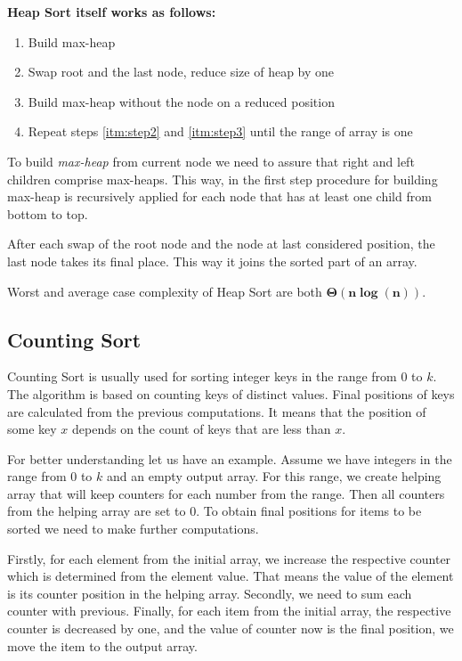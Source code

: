 \documentclass[
  field=inf,
  biblatex,
  language=english,
  glossaries,
  theorems=false,
  sourcecodes=false,
  index
]{kidiplom}
\begin{document}
\textbf{Heap Sort itself works as follows:}
\begin{enumerate}
 \item \label{itm:step1} Build max-heap
 \item \label{itm:step2} Swap root and the last node, reduce size of heap by one
 \item \label{itm:step3} Build max-heap without the node on a reduced position
 \item Repeat steps \ref{itm:step2} and \ref{itm:step3} until the range of array is one
\end{enumerate}

To build \textit{max-heap} from current node we need to assure that right and left children comprise max-heaps. This way, in the first step procedure for building max-heap is recursively applied for each node that has at least one child from bottom to top.

After each swap of the root node and the node at last considered position, the last node takes its final place. This way it joins the sorted part of an array.

Worst and average case complexity of Heap Sort are both $\bm{\Theta(n \log(n))}$.

\subsection{Counting Sort} \label{sec:counting}

Counting Sort is usually used for sorting integer keys in the range from $0$ to $k$. The algorithm is based on counting keys of distinct values. Final positions of keys are calculated from the previous computations. It means that the position of some key $x$ depends on the count of keys that are less than $x$.

For better understanding let us have an example. Assume we have integers in the range from $0$ to $k$ and an empty output array. For this range, we create helping array that will keep counters for each number from the range. Then all counters from the helping array are set to $0$. To obtain final positions for items to be sorted we need to make further computations.

Firstly, for each element from the initial array, we increase the respective counter which is determined from the element value. That means the value of the element is its counter position in the helping array. Secondly, we need to sum each counter with previous. Finally, for each item from the initial array, the respective counter is decreased by one, and the value of counter now is the final position, we move the item to the output array.
\end{document}
